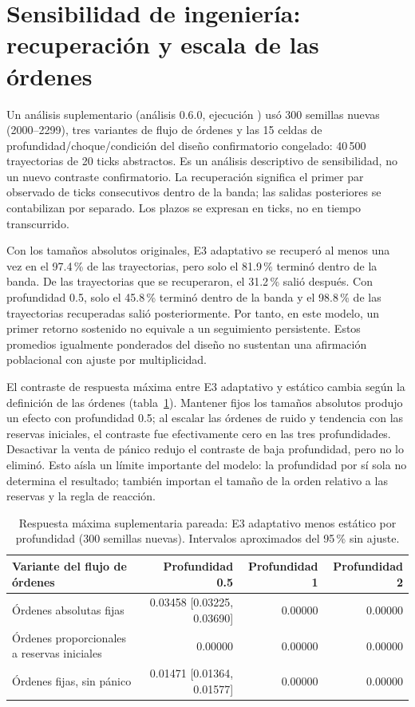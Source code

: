 \section{Sensibilidad de ingeniería: recuperación y escala de las órdenes}
\label{sec:engineering-sensitivity}

Un análisis suplementario (análisis 0.6.0, ejecución \code{\EngineeringRunID}) usó 300 semillas nuevas (2000--2299), tres variantes de flujo de órdenes y las 15 celdas de profundidad/choque/condición del diseño confirmatorio congelado: 40\,500 trayectorias de 20 ticks abstractos. Es un análisis descriptivo de sensibilidad, no un nuevo contraste confirmatorio. La recuperación significa el primer par observado de ticks consecutivos dentro de la banda; las salidas posteriores se contabilizan por separado. Los plazos se expresan en ticks, no en tiempo transcurrido.

Con los tamaños absolutos originales, E3 adaptativo se recuperó al menos una vez en el 97.4\,\% de las trayectorias, pero solo el 81.9\,\% terminó dentro de la banda. De las trayectorias que se recuperaron, el 31.2\,\% salió después. Con profundidad 0.5, solo el 45.8\,\% terminó dentro de la banda y el 98.8\,\% de las trayectorias recuperadas salió posteriormente. Por tanto, en este modelo, un primer retorno sostenido no equivale a un seguimiento persistente. Estos promedios igualmente ponderados del diseño no sustentan una afirmación poblacional con ajuste por multiplicidad.

El contraste de respuesta máxima entre E3 adaptativo y estático cambia según la definición de las órdenes (tabla~\ref{tab:engineering-sensitivity}). Mantener fijos los tamaños absolutos produjo un efecto con profundidad 0.5; al escalar las órdenes de ruido y tendencia con las reservas iniciales, el contraste fue efectivamente cero en las tres profundidades. Desactivar la venta de pánico redujo el contraste de baja profundidad, pero no lo eliminó. Esto aísla un límite importante del modelo: la profundidad por sí sola no determina el resultado; también importan el tamaño de la orden relativo a las reservas y la regla de reacción.

\begin{table}[htbp]
\centering
\caption{Respuesta máxima suplementaria pareada: E3 adaptativo menos estático por profundidad (300 semillas nuevas). Intervalos aproximados del 95\,\% sin ajuste.}
\label{tab:engineering-sensitivity}
\small
\begin{tabular}{@{}lrrr@{}}
\toprule
Variante del flujo de órdenes & Profundidad 0.5 & Profundidad 1 & Profundidad 2 \\
\midrule
Órdenes absolutas fijas & 0.03458 [0.03225, 0.03690] & 0.00000 & 0.00000 \\
Órdenes proporcionales a reservas iniciales & 0.00000 & 0.00000 & 0.00000 \\
Órdenes fijas, sin pánico & 0.01471 [0.01364, 0.01577] & 0.00000 & 0.00000 \\
\bottomrule
\end{tabular}
\end{table}

